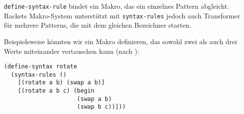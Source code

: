 % 
% 
% 
% 
% 
% 
% 
% 
% 

\texttt{define-syntax-rule} bindet ein Makro, das ein einzelnes Pattern abgleicht. Rackets Makro-System unterstützt mit \texttt{syntax-rules} jedoch auch Transformer für mehrere Patterns, die mit dem gleichen Bezeichner starten.

Beispielsweise könnten wir ein Makro definieren, das sowohl zwei als auch drei Werte miteinander vertauschen kann (nach \cite{racketguide-macros}):

\begin{lstlisting}
(define-syntax rotate
  (syntax-rules ()
    [(rotate a b) (swap a b)]
    [(rotate a b c) (begin
                     (swap a b)
                     (swap b c))]))
\end{lstlisting}

